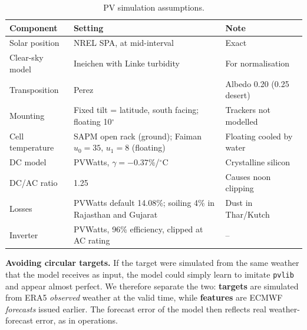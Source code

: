 \documentclass[12pt]{report}
\begin{document}
\begin{table}[htbp]
\centering
\caption{PV simulation assumptions.}
\label{tab:pvassump}
\begin{tabularx}{\textwidth}{p{3.2cm}Lp{4.2cm}}
\toprule
Component & Setting & Note \\
\midrule
Solar position & NREL SPA, at mid-interval & Exact \\
Clear-sky model & Ineichen with Linke turbidity & For normalisation \\
Transposition & Perez \cite{perez1990} & Albedo 0.20 (0.25 desert) \\
Mounting & Fixed tilt = latitude, south facing; floating 10$^\circ$ & Trackers not modelled \\
Cell temperature & SAPM open rack (ground); Faiman $u_0{=}35$, $u_1{=}8$ (floating) & Floating cooled by water \\
DC model & PVWatts, $\gamma = -0.37$\%/$^\circ$C & Crystalline silicon \\
DC/AC ratio & 1.25 & Causes noon clipping \\
Losses & PVWatts default 14.08\%; soiling 4\% in Rajasthan and Gujarat & Dust in Thar/Kutch \\
Inverter & PVWatts, 96\% efficiency, clipped at AC rating & -- \\
\bottomrule
\end{tabularx}
\end{table}

\textbf{Avoiding circular targets.} If the target were simulated from the same weather that the model receives as input, the model could simply learn to imitate \texttt{pvlib} and appear almost perfect. We therefore separate the two: \textbf{targets} are simulated from ERA5 \textit{observed} weather at the valid time, while \textbf{features} are ECMWF \textit{forecasts} issued earlier. The forecast error of the model then reflects real weather-forecast error, as in operations.
\end{document}
